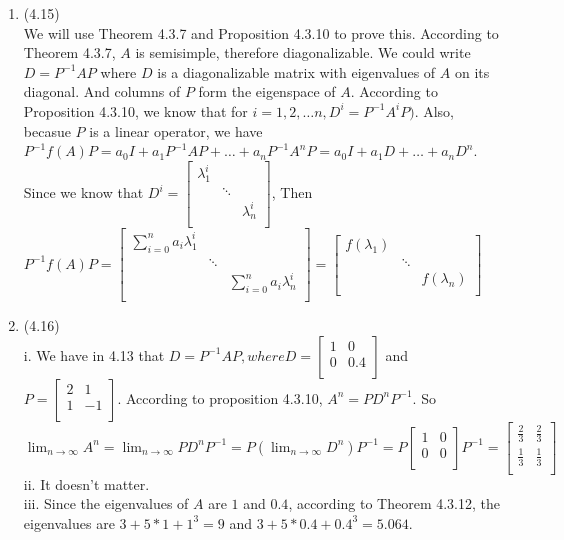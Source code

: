 \documentclass[letterpaper,12pt]{article}
\theoremstyle{definition}
\begin{document}
\begin{enumerate}
	\item(4.15)\\
	We will use Theorem 4.3.7 and Proposition 4.3.10 to prove this. According to Theorem 4.3.7, $A$ is semisimple, therefore diagonalizable. We could write $D = P^{-1}AP$ where $D$ is a diagonalizable matrix with eigenvalues of $A$ on its diagonal. And columns of $P$ form the eigenspace of $A$. According to Proposition 4.3.10, we know that for $i = 1,2, \hdots n, D^{i} = P^{-1}A^{i}P)$. Also, becasue $P$ is a linear operator, we have $P^{-1}f(A)P = a_{0}I + a_{1}P^{-1}AP + \hdots + a_{n}P^{-1}A^{n}P = a_{0}I + a_{1}D + \hdots + a_{n}D^{n}$. Since we know that $D^{i} =  \begin{bmatrix}
	   \lambda_{1}^{i} &     & \\
	    & \ddots & \\
	   &     &  \lambda_{n}^{i} \\
	\end{bmatrix}$, Then $P^{-1}f(A)P = \begin{bmatrix}
	   \sum_{i = 0}^{n} a_{i}\lambda_{1}^{i} &     & \\
	    & \ddots & \\
	   &     &  \sum_{i = 0}^{n} a_{i}\lambda_{n}^{i} \\
	\end{bmatrix} =  \begin{bmatrix}
	   f(\lambda_{1}) &     & \\
	    & \ddots & \\
	   &     &  f(\lambda_{n})\\
	\end{bmatrix}$ \\

	\item(4.16)\\
	i. We have in 4.13 that $D = P^{-1}AP, where D = \begin{bmatrix}
	   1 &    0\\
	   0 & 0.4\\
	\end{bmatrix} $ and $P =  \begin{bmatrix}
	   2 &    1\\
	   1 & -1 \\
	\end{bmatrix}$. According to proposition 4.3.10, $A^{n} = PD^{n}P^{-1}$. So $\lim_{n \to \infty}A^{n} = \lim_{n \to \infty}PD^{n}P^{-1} = P (\lim_{n \to \infty}D^{n}) P^{-1} = P \begin{bmatrix}
	   1 &  0\\
	   0 & 0 \\
	\end{bmatrix}P^{-1} =  \begin{bmatrix}
	   \frac{2}{3} &   \frac{2}{3}\\
	    \frac{1}{3} &  \frac{1}{3} \\
	\end{bmatrix}$\\
	ii. It doesn't matter.\\
	iii. Since the eigenvalues of $A$ are $1$ and $0.4$, according to Theorem 4.3.12, the eigenvalues are $3+5*1 + 1^3 = 9$ and $3 + 5*0.4 + 0.4^3 = 5.064$. \\


\end{enumerate}
\end{document}
